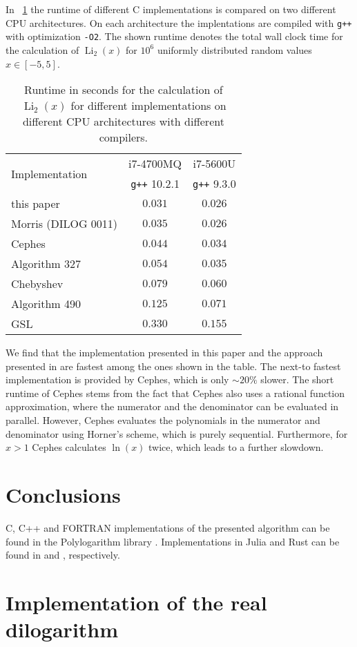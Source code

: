 \documentclass[10pt,DIV16,twocolumn,numbers=noenddot]{scrartcl}
\newcommand{\Li}{\operatorname{Li}_2}
\newcommand{\tabref}[1]{\tablename~\ref{#1}}
\begin{document}
In \tabref{tab:runtime} the runtime of different C implementations is
compared on two different CPU architectures.  On each architecture the
implentations are compiled with \texttt{g++} with optimization
\texttt{-O2}.  The shown runtime denotes the total wall clock time for
the calculation of $\Li(x)$ for $10^6$ uniformly distributed random
values $x\in[-5,5]$.
%
\begin{table}[tb]
  \centering
  \caption{Runtime in seconds for the calculation of $\Li(x)$ for
    different implementations on different CPU architectures with
    different compilers.}
  \begin{tabular}{lcc}
    \toprule
    \multirow{2}{*}{Implementation} & i7-4700MQ & i7-5600U \\
    & \texttt{g++} 10.2.1 & \texttt{g++} 9.3.0 \\
    \midrule
    this paper & $0.031$ & $0.026$ \\
    Morris (DILOG 0011) \cite{morris} & $0.035$ & $0.026$ \\
    Cephes \cite{cephes} & $0.044$ & $0.034$ \\
    Algorithm 327 \cite{koelbigDilog} & $0.054$ & $0.035$ \\
    Chebyshev \cite{luke} & $0.079$ & $0.060$ \\
    Algorithm 490 \cite{ginsberg} & $0.125$ & $0.071$ \\
    GSL \cite{gsl} & $0.330$ & $0.155$ \\
    \bottomrule
  \end{tabular}
  \label{tab:runtime}
\end{table}
%
We find that the implementation presented in this paper and the
approach presented in \cite{morris} are fastest among the ones shown
in the table.  The next-to fastest implementation is provided by
Cephes, which is only $\sim 20\%$ slower.  The short runtime of Cephes
stems from the fact that Cephes also uses a rational function
approximation, where the numerator and the denominator can be
evaluated in parallel.  However, Cephes evaluates the polynomials in
the numerator and denominator using Horner's scheme, which is purely
sequential.  Furthermore, for $x>1$ Cephes calculates $\ln(x)$ twice,
which leads to a further slowdown.

\section{Conclusions}

C, C++ and FORTRAN implementations of the presented algorithm can be
found in the Polylogarithm library \cite{polylogarithm}.
Implementations in Julia and Rust can be found in \cite{PolyLog.jl}
and \cite{polylog}, respectively.

\appendix

\section{Implementation of the real dilogarithm}






\end{document}

